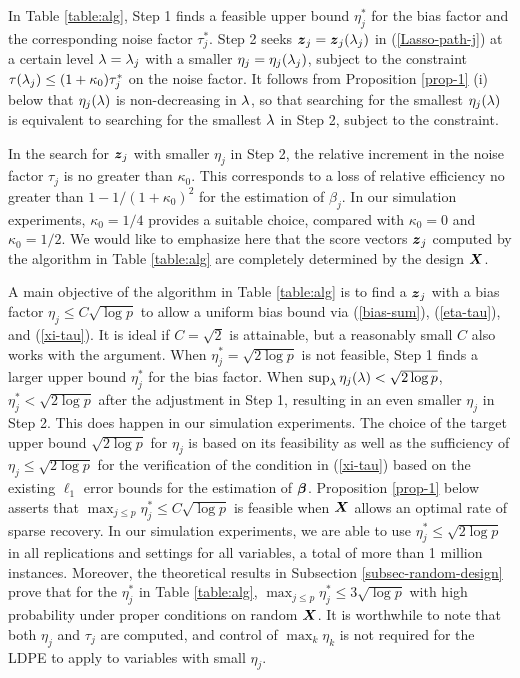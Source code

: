 \documentclass[11pt]{amsart}
\begin{document}
In Table \ref{table:alg}, Step 1 finds a feasible upper bound $\eta_j^*$ for 
the bias factor and the corresponding noise factor $\tau^*_j$.  
Step 2 seeks $\boldsymbol{z}_j=\boldsymbol{z}_j(\lambda_j)$ in (\ref{Lasso-path-j}) at a certain level $\lambda=\lambda_j$ 
with a smaller $\eta_j=\eta_j(\lambda_j)$, subject to the constraint 
$\tau(\lambda_j)\le (1+\kappa_0)\tau_j^*$ on the noise factor.  
It follows from Proposition \ref{prop-1} (i) below that $\eta_j(\lambda)$ is non-decreasing in $\lambda$, 
so that searching for the smallest $\eta_j(\lambda)$ is equivalent to searching for the smallest $\lambda$ 
in Step 2, subject to the constraint. 

In the search for $\boldsymbol{z}_j$ with smaller $\eta_j$ in Step 2, 
the relative increment in the noise factor $\tau_j$ is no greater than $\kappa_0$. 
This corresponds to a loss of relative efficiency no greater than $1-1/(1+\kappa_0)^2$ 
for the estimation of $\beta_j$. 
In our simulation experiments, $\kappa_0=1/4$ provides a suitable choice, 
compared with $\kappa_0=0$ and $\kappa_0=1/2$. 
We would like to emphasize here that the score vectors $\boldsymbol{z}_j$ 
computed by the algorithm in Table \ref{table:alg} are completely determined by the design $\boldsymbol{X}$.  

A main objective of the algorithm in Table \ref{table:alg} is to find a $\boldsymbol{z}_j$ with a bias factor 
$\eta_j\le C\sqrt{\log p}$ 
to allow a uniform bias bound via (\ref{bias-sum}), (\ref{eta-tau}), and (\ref{xi-tau}).
It is ideal if $C=\sqrt{2}$ is attainable, but a reasonably small $C$ also works with the argument. 
When $\eta^*_j=\sqrt{2\log p}$ is not feasible, Step 1 finds a larger upper bound $\eta_j^*$ for the bias factor. 
When $\sup_\lambda\eta_j(\lambda)<\sqrt{2\log p}$, $\eta_j^*<\sqrt{2\log p}$ after the adjustment in Step 1, 
resulting in an even smaller $\eta_j$ in Step 2. 
This does happen in our simulation experiments. 
The choice of the target upper bound $\sqrt{2\log p}$ for $\eta_j$ is based on its feasibility 
as well as the sufficiency of $\eta_j\le \sqrt{2\log p}$ 
for the verification of the condition in (\ref{xi-tau}) 
based on the existing $\ell_1$ error bounds for the estimation of $\boldsymbol{\beta}$. 
Proposition \ref{prop-1} below asserts that $\max_{j\le p}\eta^*_j\le C\sqrt{\log p}$ is feasible 
when $\boldsymbol{X}$ allows an optimal rate of sparse recovery. 
In our simulation experiments, we are able to use $\eta^*_j\le\sqrt{2\log p}$ 
in all replications and settings for all variables, a total of more than 1 million instances. 
Moreover, the theoretical results in Subsection \ref{subsec-random-design} prove that 
for the $\eta_j^*$ in Table \ref{table:alg}, $\max_{j\le p}\eta^*_j\le 3\sqrt{\log p}$ 
with high probability under proper conditions on random $\boldsymbol{X}$. 
It is worthwhile to note that both $\eta_j$ and $\tau_j$ are computed, and 
control of $\max_k\eta_k$ is not required for the LDPE to apply to variables with small $\eta_j$.
\end{document}
